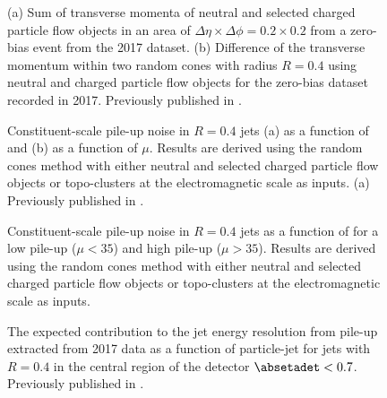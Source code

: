 \FloatBarrier
\begin{figure}[t]
    \caption{(a) Sum of transverse momenta of neutral and selected charged particle flow objects in an area of $\Delta \eta \times \Delta \phi = 0.2 \times 0.2$ from a zero-bias event from the 2017 dataset. (b) Difference of the transverse momentum within two random cones with radius $R = 0.4$ using neutral and charged particle flow objects for the zero-bias dataset recorded in 2017.
        Previously published in .}
    \label{fig:random-cones-balance}
\end{figure}

\begin{figure}[t]
    \caption{Constituent-scale pile-up noise in \antikt $R=0.4$ jets (a) as a function of \absetadet and (b) as a function of $\mu$. Results are derived using the random cones method with either neutral and selected charged particle flow objects or topo-clusters at the electromagnetic scale as inputs. (a)
        Previously published in .}
    \label{fig:const-scale-noise-results}
\end{figure}

\begin{figure}[t]
\caption{Constituent-scale pile-up noise in \antikt $R=0.4$ jets as a function of \absetadet for a low pile-up ($\mu < 35$) and high pile-up ($\mu > 35$). Results are derived using the random cones method with either neutral and selected charged particle flow objects or topo-clusters at the electromagnetic scale as inputs.}
\label{fig:const-scale-noise-pileup-dependence}
\end{figure}



\begin{figure}[t]
    \caption{The expected contribution to the jet energy resolution from pile-up extracted from 2017 data as a function of particle-jet \pT for \antikt jets with $R = 0.4$ in the central region of the detector $\absetadet < 0.7$. Previously published in .}
    \label{fig:pile-up-jer-vs-pt}
\end{figure}



